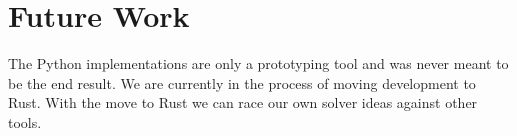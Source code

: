 \documentclass{acm_proc_article-sp}
\begin{document}
\section{Future Work}
The Python implementations are only a prototyping tool and was never meant to be the end result. We are currently in the process of moving development to Rust. With the move to Rust we can race our own solver ideas against other tools.


%

%
%
\balancecolumns



\end{document}
